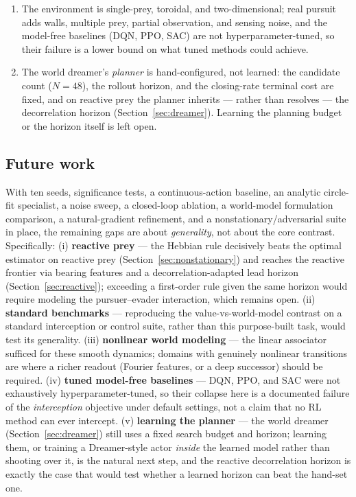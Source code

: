 \documentclass[11pt]{article}
\begin{document}
\begin{enumerate}
  the optimal estimator on nonstationary, adversarial prey (Section~\ref{sec:nonstationary}), not
  on being the raw one-step optimum.
\item The environment is single-prey, toroidal, and two-dimensional; real pursuit adds walls,
  multiple prey, partial observation, and sensing noise, and the model-free baselines (DQN,
  PPO, SAC) are not hyperparameter-tuned, so their failure is a lower bound on what tuned
  methods could achieve.
\item The world dreamer's \emph{planner} is hand-configured, not learned: the candidate count
  ($N=48$), the rollout horizon, and the closing-rate terminal cost are fixed, and on reactive
  prey the planner inherits --- rather than resolves --- the decorrelation horizon
  (Section~\ref{sec:dreamer}). Learning the planning budget or the horizon itself is left open.
\end{enumerate}

\subsection{Future work}\label{sec:future}

With ten seeds, significance tests, a continuous-action baseline, an analytic circle-fit
specialist, a noise sweep, a closed-loop ablation, a world-model formulation comparison, a
natural-gradient refinement, and a nonstationary/adversarial suite in place, the remaining gaps
are about \emph{generality}, not about the core contrast. Specifically: (i) \textbf{reactive
prey} --- the Hebbian rule decisively beats the optimal estimator on reactive prey
(Section~\ref{sec:nonstationary}) and reaches the reactive frontier via bearing features and a
decorrelation-adapted lead horizon (Section~\ref{sec:reactive}); exceeding a first-order rule given
the same horizon would require modeling the pursuer--evader interaction, which remains open. (ii) \textbf{standard benchmarks}
--- reproducing the
value-vs-world-model contrast on a standard interception or control suite, rather than this
purpose-built task, would test its generality. (iii) \textbf{nonlinear world modeling} --- the
linear associator sufficed for these smooth dynamics; domains with genuinely nonlinear
transitions are where a richer readout (Fourier features, or a deep successor) should be
required. (iv) \textbf{tuned model-free baselines} --- DQN, PPO, and SAC were not exhaustively
hyperparameter-tuned, so their collapse here is a documented failure of the \emph{interception}
objective under default settings, not a claim that no RL method can ever intercept. (v)
\textbf{learning the planner} --- the world dreamer (Section~\ref{sec:dreamer}) still uses a fixed
search budget and horizon; learning them, or training a Dreamer-style actor \emph{inside} the learned
model rather than shooting over it, is the natural next step, and the reactive decorrelation horizon
is exactly the case that would test whether a learned horizon can beat the hand-set one.
\end{document}
